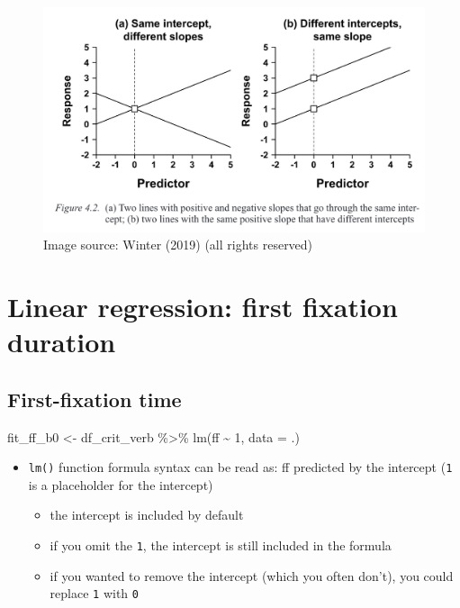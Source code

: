 \documentclass[
  letterpaper,
  DIV=11,
  numbers=noendperiod]{scrartcl}
\newenvironment{Shaded}{\begin{snugshade}}{\end{snugshade}}
\newcommand{\AttributeTok}[1]{\textcolor[rgb]{0.40,0.45,0.13}{#1}}
\newcommand{\DecValTok}[1]{\textcolor[rgb]{0.68,0.00,0.00}{#1}}
\newcommand{\FunctionTok}[1]{\textcolor[rgb]{0.28,0.35,0.67}{#1}}
\newcommand{\NormalTok}[1]{\textcolor[rgb]{0.00,0.23,0.31}{#1}}
\newcommand{\OtherTok}[1]{\textcolor[rgb]{0.00,0.23,0.31}{#1}}
\newcommand{\SpecialCharTok}[1]{\textcolor[rgb]{0.37,0.37,0.37}{#1}}
\providecommand{\tightlist}{%
  \setlength{\itemsep}{0pt}\setlength{\parskip}{0pt}}\usepackage{longtable,booktabs,array}
\begin{document}
\begin{figure}

{\centering \includegraphics[width=4.53in,height=\textheight]{_lin_reg1_files/figure-pdf/unnamed-chunk-8-1.png}

}

\caption{Image source: Winter (2019) (all rights reserved)}

\end{figure}

\hypertarget{linear-regression-first-fixation-duration}{%
\section{Linear regression: first fixation
duration}\label{linear-regression-first-fixation-duration}}

\hypertarget{first-fixation-time}{%
\subsection{First-fixation time}\label{first-fixation-time}}

\begin{Shaded}
\begin{Highlighting}[]
\NormalTok{fit\_ff\_b0 }\OtherTok{\textless{}{-}}\NormalTok{ df\_crit\_verb }\SpecialCharTok{\%\textgreater{}\%}
  \FunctionTok{lm}\NormalTok{(ff }\SpecialCharTok{\textasciitilde{}} \DecValTok{1}\NormalTok{, }\AttributeTok{data =}\NormalTok{ .)}
\end{Highlighting}
\end{Shaded}

\begin{itemize}
\tightlist
\item
  \texttt{lm()} function formula syntax can be read as: ff predicted by
  the intercept (\texttt{1} is a placeholder for the intercept)

  \begin{itemize}
  \tightlist
  \item
    the intercept is included by default
  \item
    if you omit the \texttt{1}, the intercept is still included in the
    formula
  \item
    if you wanted to remove the intercept (which you often don't), you
    could replace \texttt{1} with \texttt{0}
  \end{itemize}
\end{itemize}
\end{document}
